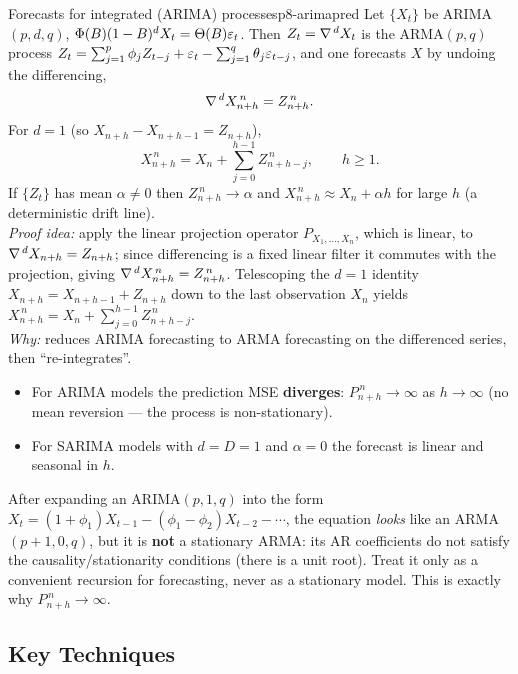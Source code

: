 \begin{proposition}{Forecasts for integrated (ARIMA) processes}{p8-arimapred}
Let $\{X_t\}$ be ARIMA$(p,d,q)$, $\Phi(B)(1-B)^dX_t=\Theta(B)\varepsilon_t$. Then
$Z_t=\nabla^{\,d}X_t$ is the ARMA$(p,q)$ process
$Z_t=\sum_{j=1}^p\phi_jZ_{t-j}+\varepsilon_t-\sum_{j=1}^q\theta_j\varepsilon_{t-j}$, and one
forecasts $X$ by undoing the differencing,
\[
\nabla^{\,d}X^{\,n}_{n+h}=Z^{\,n}_{n+h}.
\]
For $d=1$ (so $X_{n+h}-X_{n+h-1}=Z_{n+h}$),
\[
X^{\,n}_{n+h}=X_n+\sum_{j=0}^{h-1}Z^{\,n}_{n+h-j},\qquad h\ge1 .
\]
If $\{Z_t\}$ has mean $\alpha\ne0$ then $Z^{\,n}_{n+h}\to\alpha$ and
$X^{\,n}_{n+h}\approx X_n+\alpha h$ for large $h$ (a deterministic drift line).\\[2pt]
\textit{Proof idea:} apply the linear projection operator $P_{X_1,\dots,X_n}$,
which is linear, to $\nabla^{\,d}X_{n+h}=Z_{n+h}$; since differencing is a fixed
linear filter it commutes with the projection, giving
$\nabla^{\,d}X^{\,n}_{n+h}=Z^{\,n}_{n+h}$. Telescoping the $d=1$ identity
$X_{n+h}=X_{n+h-1}+Z_{n+h}$ down to the last observation $X_n$ yields
$X^{\,n}_{n+h}=X_n+\sum_{j=0}^{h-1}Z^{\,n}_{n+h-j}$.\\[2pt]
\textit{Why:} reduces ARIMA forecasting to ARMA forecasting on the differenced
series, then ``re-integrates''.
\begin{itemize}
  \item For ARIMA models the prediction MSE \textbf{diverges}:
        $P^{\,n}_{n+h}\to\infty$ as $h\to\infty$ (no mean reversion --- the
        process is non-stationary).
  \item For SARIMA models with $d=D=1$ and $\alpha=0$ the forecast is linear and
        seasonal in $h$.
\end{itemize}
\end{proposition}

\begin{pitfall}
After expanding an ARIMA$(p,1,q)$ into the form
$X_t=(1+\phi_1)X_{t-1}-(\phi_1-\phi_2)X_{t-2}-\cdots$, the equation \emph{looks}
like an ARMA$(p{+}1,0,q)$, but it is \textbf{not} a stationary ARMA: its AR
coefficients do not satisfy the causality/stationarity conditions (there is a
unit root). Treat it only as a convenient recursion for forecasting, never as a
stationary model. This is exactly why $P^{\,n}_{n+h}\to\infty$.
\end{pitfall}

\subsection{Key Techniques}

